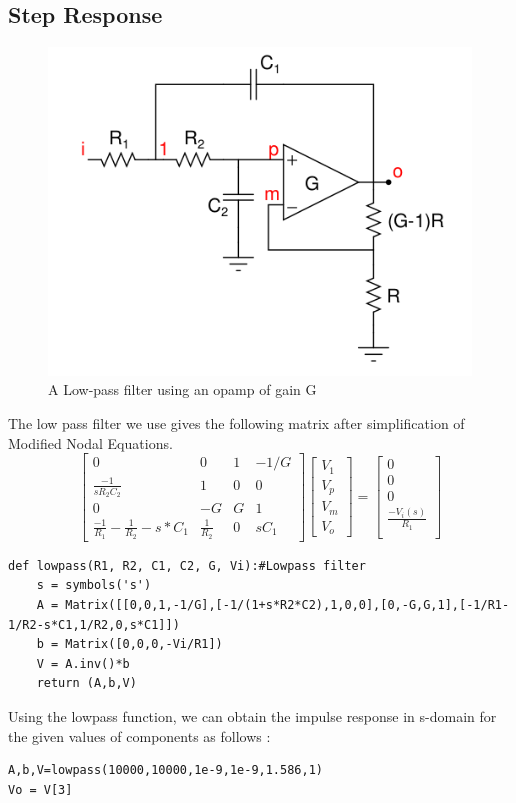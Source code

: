 \documentclass[11pt, a4paper]{article}
\begin{document}
\subsection{Step Response}
\begin{figure}[!tbh]
   	\centering
   	\includegraphics[scale=0.5]{fig6.png}  %
   	\caption{A Low-pass filter using an opamp of gain G}
   	\label{fig:sample}
   \end{figure} 
   The low pass filter we use gives the following matrix after simplification of Modified Nodal Equations.
\[
\begin{bmatrix}
    0   & 0 & 1  & -1/G \\
    \frac{-1}{sR_2C_2}  & 1 & 0 & 0\\
    0  & -G & G & 1 \\
    \frac{-1}{R_1} - \frac{1}{R_2} - s*C_1 & \frac{1}{R_2} & 0 & sC_1
\end{bmatrix}
\begin{bmatrix}
    V_1\\
    V_p\\
    V_m \\
    V_o
\end{bmatrix}
=
\begin{bmatrix}
    0 \\
    0 \\
    0 \\
    \frac{-V_i(s)}{R_1} \\
    
\end{bmatrix}
\]
\begin{verbatim}	
def lowpass(R1, R2, C1, C2, G, Vi):#Lowpass filter 
    s = symbols('s')
    A = Matrix([[0,0,1,-1/G],[-1/(1+s*R2*C2),1,0,0],[0,-G,G,1],[-1/R1-1/R2-s*C1,1/R2,0,s*C1]])
    b = Matrix([0,0,0,-Vi/R1])
    V = A.inv()*b
    return (A,b,V)
\end{verbatim}
Using the lowpass function, we can obtain the impulse response in s-domain for the given values of components as follows :
\begin{verbatim}
A,b,V=lowpass(10000,10000,1e-9,1e-9,1.586,1)
Vo = V[3]
\end{verbatim}
\end{document}
